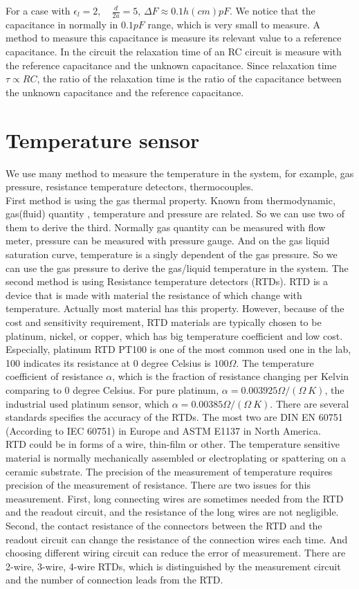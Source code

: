 For a case with $\epsilon_l = 2, \quad \frac{d}{2a} = 5 $, $\Delta F \approx 0.1 h (cm) pF$.
We notice that the capacitance in normally in $0.1 pF$ range, which is very small to measure. A method to measure this capacitance is measure its relevant value to a reference capacitance. In the circuit the relaxation time of an RC circuit is measure with the reference capacitance and the unknown capacitance. Since relaxation time $\tau \propto RC$, the ratio of the relaxation time is the ratio of the capacitance between the unknown capacitance and the reference capacitance.  
\section{Temperature sensor}
We use many method to measure the temperature in the system, for example, gas pressure, resistance temperature detectors, thermocouples. \\  
First method is using the gas thermal property. Known from thermodynamic, gas(fluid) quantity , temperature and pressure are related. So we can use two of them to derive the third. Normally gas quantity can be measured with flow meter, pressure can be measured with pressure gauge. And on the gas liquid saturation curve, temperature is a singly dependent of the gas pressure. So we can use the gas pressure to derive the gas/liquid temperature in the system.   
The second method is using Resistance temperature detectors (RTDs). RTD is a device that is made with material the resistance of which change with temperature. Actually most material has this property. However, because of the cost and sensitivity requirement, RTD materials are typically chosen to be platinum, nickel, or copper, which has big temperature coefficient and low cost. Especially, platinum RTD PT100 is one of the most common used one in the lab, 100 indicates its resistance at 0 degree Celsius is $100 \Omega$. The temperature coefficient of resistance $\alpha$, which is the fraction of resistance changing per Kelvin comparing to 0 degree Celsius. For pure platinum, $\alpha = 0.003925 \Omega/(\Omega\ K)$, the industrial used platinum sensor, which $\alpha = 0.00385 \Omega/(\Omega\ K)$. There are several standards specifies the accuracy of the RTDs. The most two are DIN EN 60751 (According to IEC 60751) in Europe and ASTM E1137 in North America.     
\\ 
RTD could be in forms of a wire, thin-film or other. The temperature sensitive material is normally mechanically assembled or electroplating or spattering on a ceramic substrate. The precision of the measurement of temperature requires precision of the measurement of resistance. There are two issues for this measurement. First, long connecting wires are sometimes needed from the RTD and the readout circuit, and the resistance of the long wires are not negligible. Second, the contact resistance of the connectors between the RTD and the readout circuit can change the resistance of the connection wires each time. And choosing different wiring circuit can reduce the error of measurement. There are 2-wire, 3-wire, 4-wire RTDs, which is distinguished by the measurement circuit and the number of connection leads from the RTD.\\

